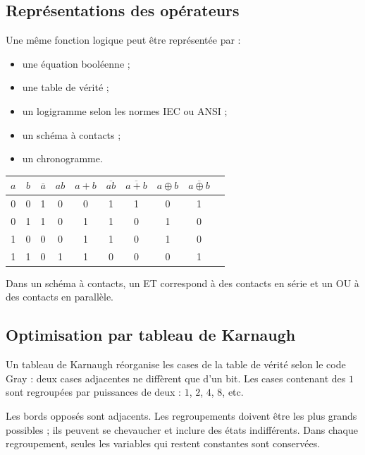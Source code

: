 \subsection{Représentations des opérateurs}

Une même fonction logique peut être représentée par :
\begin{itemize}
  \item une équation booléenne ;
  \item une table de vérité ;
  \item un logigramme selon les normes IEC ou ANSI ;
  \item un schéma à contacts ;
  \item un chronogramme.
\end{itemize}

\begin{center}
\small
\begin{tabular}{cc|cccccccc}
$a$&$b$&$\overline a$&$ab$&$a+b$&$\overline{ab}$&$\overline{a+b}$&$a\oplus b$&$\overline{a\oplus b}$\\\hline
0&0&1&0&0&1&1&0&1\\
0&1&1&0&1&1&0&1&0\\
1&0&0&0&1&1&0&1&0\\
1&1&0&1&1&0&0&0&1
\end{tabular}
\end{center}

Dans un schéma à contacts, un ET correspond à des contacts en série et un OU à des contacts en parallèle.

\subsection{Optimisation par tableau de Karnaugh}

Un tableau de Karnaugh réorganise les cases de la table de vérité selon le code Gray : deux cases adjacentes ne diffèrent que d'un bit. Les cases contenant des $1$ sont regroupées par puissances de deux : $1$, $2$, $4$, $8$, etc.

\begin{center}\TLKarnaughQuatre\end{center}

Les bords opposés sont adjacents. Les regroupements doivent être les plus grands possibles ; ils peuvent se chevaucher et inclure des états indifférents. Dans chaque regroupement, seules les variables qui restent constantes sont conservées.


